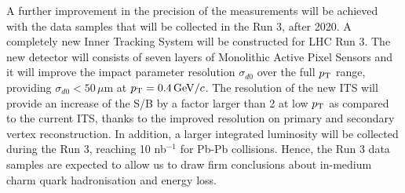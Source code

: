  
 
A further improvement in the precision of the measurements will be achieved with the data samples
that will be collected in the Run 3, after 2020. A completely new Inner Tracking System will be constructed for LHC Run 3.
 The new detector will consists of seven layers of Monolithic Active Pixel Sensors and it will improve
 the impact parameter resolution $\sigma_{d0}$ over the full $p_{\rm T}$ range, providing $\sigma_{d0}<50\,\mu$m at
 $p_{\rm T} = 0.4 \, \mathrm{GeV}/c$. The resolution of the new ITS will provide an increase of the S/B by a factor larger than 2 at low $p_{\rm T}$ 
 as compared to the current ITS, thanks to the improved resolution on primary and secondary vertex reconstruction. In addition, 
a larger integrated luminosity will be collected during the Run 3, reaching 10 nb$^{-1}$ for Pb-Pb collisions. Hence,
the Run 3 data samples are expected to allow us to draw firm conclusions 
about in-medium charm quark hadronisation and energy loss.
  




